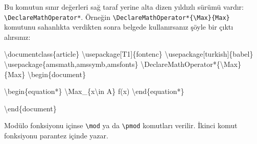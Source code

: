 \documentclass[
  letterpaper,
  DIV=11,
  numbers=noendperiod]{scrreprt}
\newenvironment{Shaded}{\begin{snugshade}}{\end{snugshade}}
\newcommand{\BuiltInTok}[1]{\textcolor[rgb]{0.00,0.23,0.31}{#1}}
\newcommand{\ExtensionTok}[1]{\textcolor[rgb]{0.00,0.23,0.31}{#1}}
\newcommand{\FunctionTok}[1]{\textcolor[rgb]{0.28,0.35,0.67}{#1}}
\newcommand{\KeywordTok}[1]{\textcolor[rgb]{0.00,0.23,0.31}{#1}}
\newcommand{\NormalTok}[1]{\textcolor[rgb]{0.00,0.23,0.31}{#1}}
\newcommand{\SpecialCharTok}[1]{\textcolor[rgb]{0.37,0.37,0.37}{#1}}
\newcommand{\SpecialStringTok}[1]{\textcolor[rgb]{0.13,0.47,0.30}{#1}}
\begin{document}
Bu komutun sınır değerleri sağ taraf yerine alta dizen yıldızlı sürümü
vardır: \texttt{\textbackslash{}DeclareMathOperator*}. Örneğin
\texttt{\textbackslash{}DeclareMathOperator*\{\textbackslash{}Max\}\{Max\}}
komutunu sahanlıkta verdikten sonra belgede kullanırsanız şöyle bir
çıktı alırsınız:

\begin{Shaded}
\begin{Highlighting}[]
\BuiltInTok{\textbackslash{}documentclass}\NormalTok{\{}\ExtensionTok{article}\NormalTok{\}}
\BuiltInTok{\textbackslash{}usepackage}\NormalTok{[T1]\{}\ExtensionTok{fontenc}\NormalTok{\}}
\BuiltInTok{\textbackslash{}usepackage}\NormalTok{[turkish]\{}\ExtensionTok{babel}\NormalTok{\}}
\BuiltInTok{\textbackslash{}usepackage}\NormalTok{\{}\ExtensionTok{amsmath,amssymb,amsfonts}\NormalTok{\}}
\FunctionTok{\textbackslash{}DeclareMathOperator*}\NormalTok{\{}\FunctionTok{\textbackslash{}Max}\NormalTok{\}\{Max\}}
\KeywordTok{\textbackslash{}begin}\NormalTok{\{}\ExtensionTok{document}\NormalTok{\}}

\KeywordTok{\textbackslash{}begin}\NormalTok{\{}\ExtensionTok{equation*}\NormalTok{\}}
\SpecialStringTok{ }\SpecialCharTok{\textbackslash{}Max}\SpecialStringTok{\_\{x}\SpecialCharTok{\textbackslash{}in}\SpecialStringTok{ A\} f(x)}
\KeywordTok{\textbackslash{}end}\NormalTok{\{}\ExtensionTok{equation*}\NormalTok{\}}

\KeywordTok{\textbackslash{}end}\NormalTok{\{}\ExtensionTok{document}\NormalTok{\}}
\end{Highlighting}
\end{Shaded}

Modülo fonksiyonu içinse \texttt{\textbackslash{}mod} ya da
\texttt{\textbackslash{}pmod} komutları verilir. İkinci komut fonksiyonu
parantez içinde yazar.

\begin{Shaded}
\end{Shaded}
\end{document}
